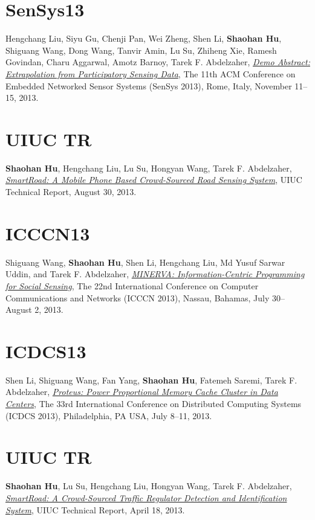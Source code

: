 \section{\sc SenSys13}\hypertarget{liu2013sensys}{}
Hengchang Liu, Siyu Gu, Chenji Pan, Wei Zheng, Shen Li,
\textbf{Shaohan Hu}, Shiguang Wang, Dong Wang, Tanvir Amin, Lu Su,
Zhiheng Xie, Ramesh Govindan, Charu Aggarwal, Amotz Barnoy, Tarek F.
Abdelzaher, \href{http://portal.acm.org/citation.cfm?id=2517431}{\emph{Demo Abstract: Extrapolation from Participatory
  Sensing Data}}, \textsf{The 11th ACM Conference on Embedded Networked
  Sensor Systems (SenSys 2013)}, Rome, Italy, November 11--15, 2013.

\section{\sc UIUC TR}\hypertarget{hu2013uiuc2}{}
\textbf{Shaohan Hu}, Hengchang Liu, Lu Su, Hongyan Wang, Tarek F.
Abdelzaher, \href{https://www.ideals.illinois.edu/handle/2142/45699}{\emph{SmartRoad: A Mobile Phone Based Crowd-Sourced Road
  Sensing System}}, \textsf{UIUC Technical Report}, August 30, 2013.

\section{\sc ICCCN13}\hypertarget{wang2013icccn}{}
Shiguang Wang, \textbf{Shaohan Hu}, Shen Li, Hengchang Liu, Md Yusuf
Sarwar Uddin, and Tarek F. Abdelzaher, \href{http://ieeexplore.ieee.org/xpls/abs_all.jsp?arnumber=6614152}{\emph{MINERVA: Information-Centric
  Programming for Social Sensing}}, \textsf{The 22nd International
  Conference on Computer Communications and Networks (ICCCN 2013)},
Nassau, Bahamas, July 30--August 2, 2013.

\section{\sc ICDCS13}\hypertarget{li2013icdcs}{}
Shen Li, Shiguang Wang, Fan Yang, \textbf{Shaohan Hu}, Fatemeh Saremi,
Tarek F. Abdelzaher, \href{http://ieeexplore.ieee.org/xpl/articleDetails.jsp?arnumber=6681577}{\emph{Proteus: Power Proportional Memory Cache
  Cluster in Data Centers}}, \textsf{The 33rd International Conference
  on Distributed Computing Systems (ICDCS 2013)}, Philadelphia, PA USA,
July 8--11, 2013.

\section{\sc UIUC TR}\hypertarget{hu2013uiuc1}{}
\textbf{Shaohan Hu}, Lu Su, Hengchang Liu, Hongyan Wang, Tarek F.
Abdelzaher, \href{https://www.ideals.illinois.edu/handle/2142/43856}{\emph{SmartRoad: A Crowd-Sourced Traffic Regulator
  Detection and Identification System}}, \textsf{UIUC Technical
  Report}, April 18, 2013.

